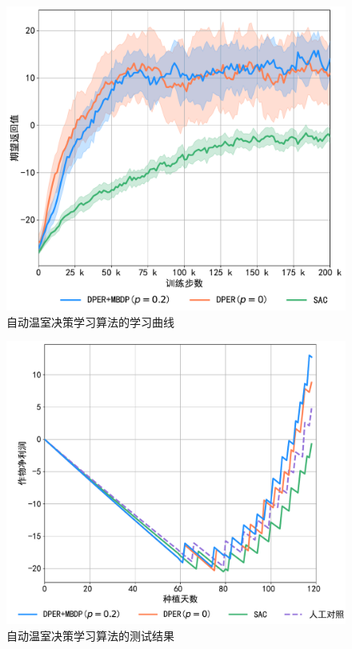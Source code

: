 \begin{figure}[ht]
\centering
\includegraphics[width=\textwidth]{figures/acml-train.pdf}
\caption{自动温室决策学习算法的学习曲线}
\label{fig:acml-train}
\end{figure}

\begin{figure}[ht]
\centering
\includegraphics[width=\textwidth]{figures/acml-test.pdf}
\caption{自动温室决策学习算法的测试结果}
\label{fig:acml-test}
\end{figure}

